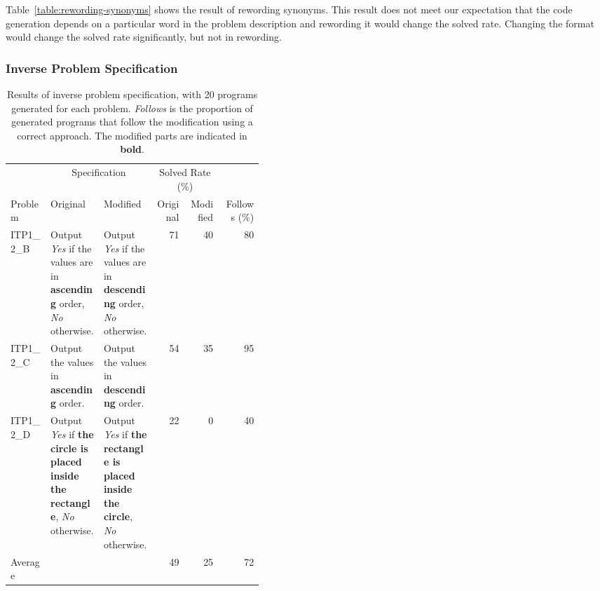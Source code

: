 \documentclass{article}
\begin{document}
Table~\ref{table:rewording-synonyms} shows the result of rewording synonyms.
This result does not meet our expectation that the code generation depends on a particular word in the problem description and rewording it would change the solved rate.
Changing the format would change the solved rate significantly, but not in rewording.





\subsubsection{Inverse Problem Specification}
\label{sec:results:modification:inversion}

\begin{table}[ht]
\begin{center}
\begin{minipage}{\linewidth}
    \caption{Results of inverse problem specification, with 20 programs generated for each problem. \textit{Follows} is the proportion of generated programs that follow the modification using a correct approach. The modified parts are indicated in \textbf{bold}.}
    \label{table:inversion-result}
    \begin{tabular*}{\linewidth}
    {lp{0.21\linewidth} p{0.21\linewidth}rrr}
        \toprule
        & \multicolumn{2}{c}{Specification} & \multicolumn{2}{c}{Solved Rate (\%)} \\
        \cmidrule{2-3}\cmidrule{4-5}
        Problem & Original & Modified & Original & Modified & Follows (\%) \\ 
        \midrule
        ITP1\_2\_B & Output \textit{Yes} if the values are in \textbf{ascending} order, \textit{No} otherwise. & Output \textit{Yes} if the values are in \textbf{descending} order, \textit{No} otherwise. & 71 & 40 & 80 \\
        ITP1\_2\_C & Output the values in \textbf{ascending} order. & Output the values in \textbf{descending} order. & 54 & 35 & 95 \\
        ITP1\_2\_D & Output \textit{Yes} if \textbf{the circle is placed inside the rectangle}, \textit{No} otherwise. & Output \textit{Yes} if \textbf{the rectangle is placed inside the circle}, \textit{No} otherwise. & 22 & 0 & 40 \\
        \midrule
        Average & & & 49 & 25 & 72 \\
        \bottomrule
    \end{tabular*}
\end{minipage}
\end{center}
\end{table}
\end{document}
